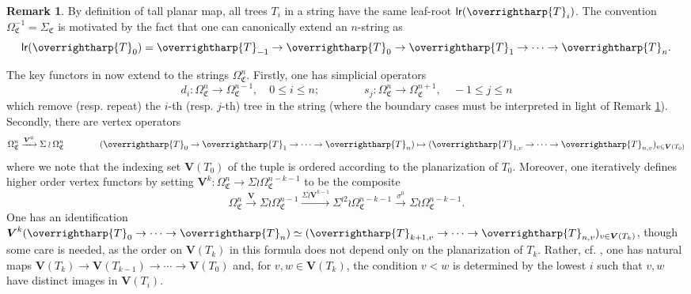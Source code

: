 \documentclass[a4paper,10pt
,draft
]{article}%
\numberwithin{equation}{section}
\numberwithin{figure}{section}
\theoremstyle{definition} %
\newtheorem{remark}[equation]{Remark}%
\newcommand{\vect}[1]{\text{\overrightharp{\ensuremath{#1}}}}
\newcommand{\1}{\ensuremath{\mathbbm 1}}%
\begin{document}
\begin{remark}\label{ADDCOROL REM}
	By definition of tall planar map, 
	all trees $T_i$ in a string have the same leaf-root
	$\mathsf{lr}(\vect{T}_i)$. The convention $\Omega^{-1}_{\mathfrak{C}} = \Sigma_{\mathfrak{C}}$ 
	is motivated by the fact that one can 
	canonically extend an $n$-string as
	\[\mathsf{lr}(\vect{T}_0)=\vect{T}_{-1} \to \vect{T}_0 \to \vect{T}_1 \to \cdots \to \vect{T}_n.\]
\end{remark}




The key functors in \cite[\S 3.4]{BP_geo} now extend to the strings
$\Omega_{\mathfrak{C}}^n$.
Firstly, one has simplicial operators
\[
d_i \colon \Omega_{\mathfrak{C}}^n \to \Omega_{\mathfrak{C}}^{n-1},
\quad 0 \leq i \leq n;
\qquad \qquad
s_j \colon \Omega_{\mathfrak{C}}^{n} \to \Omega_{\mathfrak{C}}^{n+1},
\quad -1 \leq j \leq n
\]
which remove (resp. repeat) the $i$-th (resp. $j$-th) tree in the string (where the boundary cases must be interpreted in light of 
Remark \ref{ADDCOROL REM}).
Secondly, there are vertex operators
\[
\Omega^{n}_{\mathfrak{C}}
\xrightarrow{\boldsymbol{V}^0}
\Sigma \wr \Omega^{n}_{\mathfrak{C}}
\qquad \qquad
(\vect{T}_0 \to \vect{T}_1 \to \cdots \to \vect{T}_n)
\mapsto
(\vect{T}_{1,v} \to \cdots \to \vect{T}_{n,v})_{v \in \boldsymbol{V}(T_0)}
\]
where we note that the indexing set 
$\boldsymbol{V}(T_0)$ of the tuple
is ordered according to the planarization of $T_0$.
Moreover, one iteratively defines higher order vertex functors
by setting 
$\boldsymbol{V}^{k}\colon \Omega^{n}_{\mathfrak{C}}
\to \Sigma \wr \Omega^{n-k-1}_{\mathfrak{C}}$
to be the composite
\begin{equation}\label{VKDEF EQ}
\Omega^{n}_{\mathfrak{C}}
\xrightarrow{\boldsymbol{V}}
\Sigma \wr\Omega^{n-1}_{\mathfrak{C}}
\xrightarrow{\Sigma \wr \boldsymbol{V}^{k-1}}
\Sigma^{\wr 2} \wr \Omega^{n-k-1}_{\mathfrak{C}}
\xrightarrow{\sigma^0}
\Sigma \wr \Omega^{n-k-1}_{\mathfrak{C}}.
\end{equation}
One has an identification
$\boldsymbol{V}^k(\vect{T}_0 \to \cdots \to \vect{T}_n)
\simeq (\vect{T}_{k+1,v} \to \cdots \to \vect{T}_{n,v})_{v \in \boldsymbol{V}(T_k)}$, though some care is needed,
as the order on $\boldsymbol{V}(T_k)$ in this formula
does not depend only on the planarization of $T_k$.
Rather, cf. \cite[(3.99)]{BP_geo},
one has natural maps 
$\boldsymbol{V}(T_k) \to \boldsymbol{V}(T_{k-1}) 
\to \cdots
\to \boldsymbol{V}(T_{0})$
and, for $v,w \in \boldsymbol{V}(T_k)$,
the condition $v<w$
is determined by the lowest $i$
such that $v,w$ have distinct images in 
$\boldsymbol{V}(T_i)$.
\end{document}
